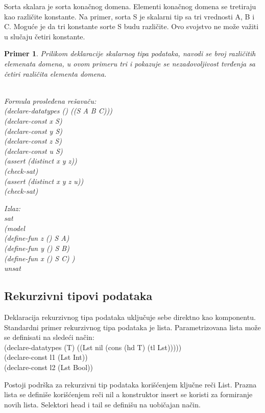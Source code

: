 \documentclass[12pt,oneside]{memoir}
\newtheorem{primer}{Primer}
\begin{document}
Sorta skalara je sorta konačnog domena. Elementi konačnog domena se tretiraju kao različite konstante. Na primer, sorta S je skalarni tip sa tri vrednosti A, B i C. Moguće je da tri konstante sorte S budu različite. Ovo svojstvo ne može važiti u slučaju četiri konstante.

\begin{primer} Prilikom deklaracije skalarnog tipa podataka, navodi se broj različitih elemenata domena, u ovom primeru tri i pokazuje se nezadovoljivost tvrđenja sa četiri različita elementa domena. \\ \\
\begin{minipage}[b]{0.5\textwidth}
Formula prosleđena rešavaču:
\\(declare-datatypes () ((S A B C)))
\\(declare-const x S)
\\(declare-const y S)
\\(declare-const z S)
\\(declare-const u S)
\\(assert (distinct x y z))
\\(check-sat)
\\(assert (distinct x y z u))
\\(check-sat)
\end{minipage}
\hspace{3cm} 
\begin{minipage}[t]{0.5\textwidth}
\vspace{-5.9cm}
Izlaz:
\\sat 
\\(model 
\\(define-fun z () S A) 
\\(define-fun y () S B) 
\\(define-fun x () S C) ) 
\\unsat
\end{minipage}
\end{primer}

\subsection{Rekurzivni tipovi podataka}

Deklaracija rekurzivnog tipa podataka uključuje sebe direktno kao komponentu. Standardni primer rekurzivnog tipa podataka je lista. Parametrizovana lista može se definisati na sledeći način:\\
(declare-datatypes (T) ((Lst nil (cons (hd T) (tl Lst)))))
\\(declare-const l1 (Lst Int))
\\(declare-const l2 (Lst Bool))
\par
Postoji podrška za rekurzivni tip podataka korišćenjem ključne reči List. 
Prazna lista se definiše korišćenjem reči nil a konstruktor insert se koristi za formiranje novih lista. Selektori head i tail se definišu na uobičajan način.
\end{document}
